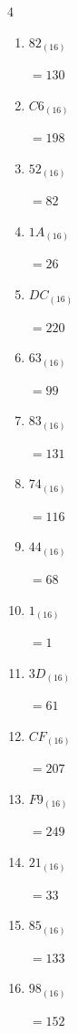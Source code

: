 \begin{multicols}{4}
\begin{enumerate}
  \item $82_{(16)}$

        $=130$

  \item $C6_{(16)}$

        $=198$

  \item $52_{(16)}$

        $=82$

  \item $1A_{(16)}$

        $=26$

  \item $DC_{(16)}$

        $=220$

  \item $63_{(16)}$

        $=99$

  \item $83_{(16)}$

        $=131$

  \item $74_{(16)}$

        $=116$

  \item $44_{(16)}$

        $=68$

  \item $1_{(16)}$

        $=1$

  \item $3D_{(16)}$

        $=61$

  \item $CF_{(16)}$

        $=207$

  \item $F9_{(16)}$

        $=249$

\columnbreak %

\resetques

  \item $21_{(16)}$

        $=33$

  \item $85_{(16)}$

        $=133$

  \item $98_{(16)}$

        $=152$


\end{enumerate}
\end{multicols}
